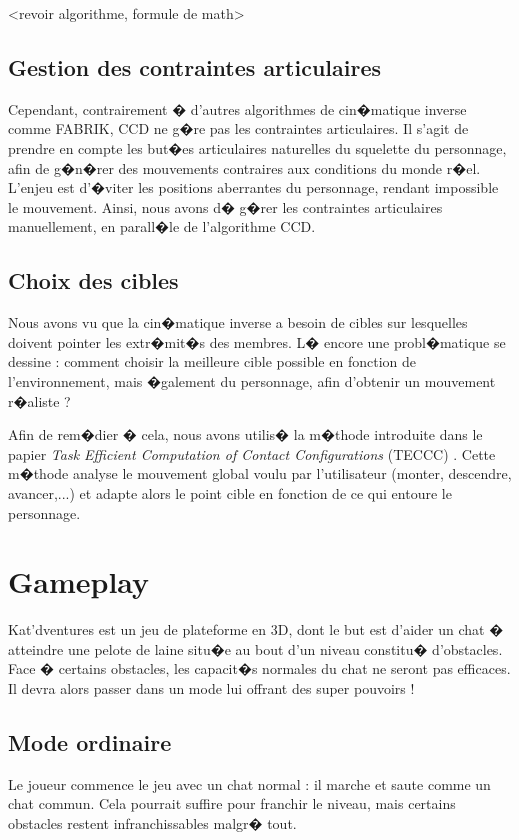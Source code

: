 \documentclass[a4paper,11pt]{article}
\begin{document}
<revoir algorithme, formule de math>



\subsection{Gestion des contraintes articulaires}
Cependant, contrairement � d'autres algorithmes de cin�matique inverse comme FABRIK, CCD ne g�re pas les contraintes articulaires. Il s'agit de prendre en compte les but�es articulaires naturelles du squelette du personnage, afin de g�n�rer des mouvements contraires aux conditions du monde r�el. L'enjeu est d'�viter les positions aberrantes du personnage, rendant impossible le mouvement. Ainsi, nous avons d� g�rer les contraintes articulaires manuellement, en parall�le de l'algorithme CCD.

\subsection{Choix des cibles}
Nous avons vu que la cin�matique inverse a besoin de cibles sur lesquelles doivent pointer les extr�mit�s des membres. L� encore une probl�matique se dessine : comment choisir la meilleure cible possible en fonction de l'environnement, mais �galement du personnage, afin d'obtenir un mouvement r�aliste ?

Afin de rem�dier � cela, nous avons utilis� la m�thode introduite dans le papier \textit{Task Efficient Computation of Contact Configurations}  (TECCC) \cite{tonneau:latex:14}. Cette m�thode analyse le mouvement global voulu par l'utilisateur (monter, descendre, avancer,...) et adapte alors le point cible en fonction de ce qui entoure le personnage. 


\section{Gameplay}
Kat'dventures est un jeu de plateforme en 3D, dont le but est d'aider un chat � atteindre une pelote de laine situ�e au bout d'un niveau constitu� d'obstacles. Face � certains obstacles, les capacit�s normales du chat ne seront pas efficaces. Il devra alors passer dans un mode lui offrant des super pouvoirs !
\subsection{Mode ordinaire}
Le joueur commence le jeu avec un chat normal : il marche et saute comme un chat commun. Cela pourrait suffire pour franchir le niveau, mais certains obstacles restent infranchissables malgr� tout.
\end{document}
